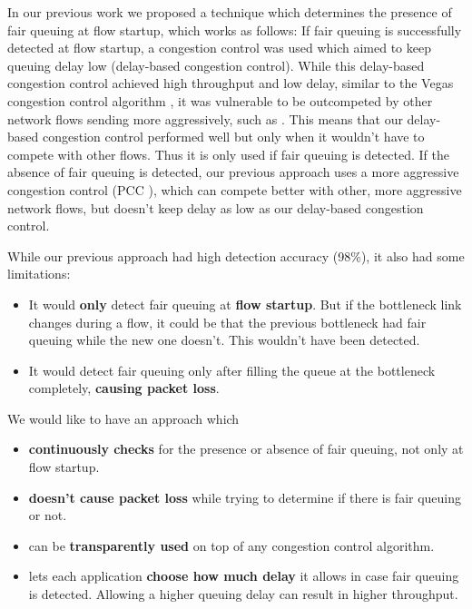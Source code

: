 \documentclass[conference]{IEEEtran}
\begin{document}
In our previous work we proposed a technique which determines the presence of fair queuing at flow startup, which works as follows: 
If fair queuing is successfully detected at flow startup, a congestion control was used which aimed to keep queuing delay low (delay-based congestion control). 
While this delay-based congestion control achieved high throughput and low delay, similar to the Vegas congestion control algorithm \cite{brakmo_tcp_1995}, 
it was vulnerable to be outcompeted by other network flows sending more aggressively, such as \cite{cardwell_bbr_2016,dong_pcc_2015,ha_cubic_2008}.
This means that our delay-based congestion control performed well but only when it wouldn't have to compete with other flows. Thus it is only used if fair queuing is detected. 
If the absence of fair queuing is detected, our previous approach uses a more aggressive congestion control (PCC \cite{dong_pcc_2015}), which can compete better with other, more aggressive network flows,
but doesn't keep delay as low as our delay-based congestion control. 

While our previous approach had high detection accuracy (98\%), it also had some limitations:
\begin{itemize}
    \item It would \textbf{only} detect fair queuing at \textbf{flow startup}. 
    But if the bottleneck link changes during a flow, it could be that the previous bottleneck had fair queuing while the new one doesn't. This wouldn't have been detected. 
    \item It would detect fair queuing only after filling the queue at the bottleneck completely, \textbf{causing packet loss}. 
\end{itemize}

We would like to have an approach which 
\begin{itemize}
    \item \textbf{continuously checks} for the presence or absence of fair queuing, not only at flow startup. 
    \item \textbf{doesn't cause packet loss} while trying to determine if there is fair queuing or not. 
    \item can be \textbf{transparently used} on top of any congestion control algorithm. 
    \item lets each application \textbf{choose how much delay} it allows in case fair queuing is detected. Allowing a higher queuing delay can result in higher throughput. 
\end{itemize} 
\end{document}
